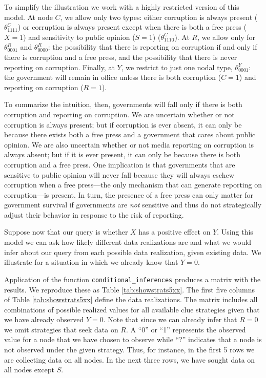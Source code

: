 \documentclass[
  12pt,
]{book}
\begin{document}
To simplify the illustration we work with a highly restricted version of this model. At node \(C\), we allow only two types: either corruption is always present (\(\theta^C_{1111}\)) or corruption is always present except when there is both a free press (\(X=1\)) and sensitivity to public opinion (\(S=1\)) (\(\theta^C_{1110}\)). At \(R\), we allow only for \(\theta^R_{0001}\) and \(\theta^R_{0000}\): the possibility that there is reporting on corruption if and only if there is corruption and a free press, and the possibility that there is never reporting on corruption. Finally, at \(Y\), we restrict to just one nodal type, \(\theta^Y_{0001}\): the government will remain in office unless there is both corruption (\(C=1\)) and reporting on corruption (\(R=1\)).

To summarize the intuition, then, governments will fall only if there is both corruption and reporting on corruption. We are uncertain whether or not corruption is always present; but if corruption is ever absent, it can only be because there exists both a free press and a government that cares about public opinion. We are also uncertain whether or not media reporting on corruption is always absent; but if it is ever present, it can only be because there is both corruption and a free press. One implication is that governments that are sensitive to public opinion will never fall because they will always eschew corruption when a free press---the only mechanism that can generate reporting on corruption---is present. In turn, the presence of a free press can only matter for government survival if governments are \emph{not} sensitive and thus do not strategically adjust their behavior in response to the risk of reporting.

Suppose now that our query is whether \(X\) has a positive effect on \(Y\). Using this model we can ask how likely different data realizations are and what we would infer about our query from each possible data realization, given existing data. We illustrate for a situation in which we already know that \(Y=0\).

Application of the function \texttt{conditional\_inferences} produces a matrix with the results. We reproduce these as Table \ref{tab:showstrats5xx}. The first five columns of Table \ref{tab:showstrats5xx} define the data realizations. The matrix includes all combinations of possible realized values for all available clue strategies given that we have already observed \(Y=0\). Note that since we can already infer that \(R=0\) we omit strategies that seek data on \(R\). A ``0'' or ``1'' represents the observed value for a node that we have chosen to observe while ``?'' indicates that a node is not observed under the given strategy. Thus, for instance, in the first 5 rows we are collecting data on all nodes. In the next three rows, we have sought data on all nodes except \(S\).
\end{document}
